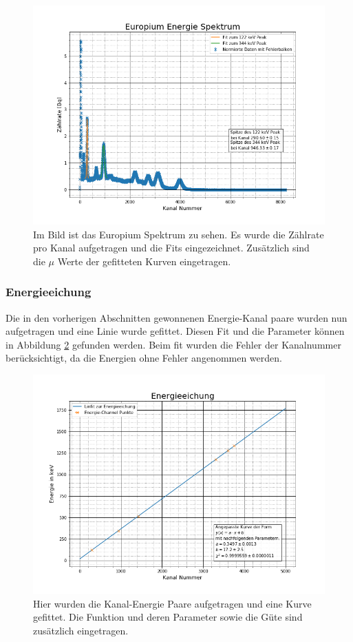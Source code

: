 \begin{figure}[h]
	\centering
	\includegraphics[scale=0.5]{Bilder/Europium}
	\caption[Europium Spektrum mit Peaks]{\small Im Bild ist das Europium Spektrum zu sehen. Es wurde die Zählrate pro Kanal aufgetragen und die Fits eingezeichnet. Zusätzlich sind die $\mu$ Werte der gefitteten Kurven eingetragen.}
	\label{europium}
\end{figure}
\subsubsection{Energieeichung}
Die in den vorherigen Abschnitten gewonnenen Energie-Kanal paare wurden nun aufgetragen und eine Linie wurde gefittet. Diesen Fit und die Parameter können in Abbildung \ref{energiekali} gefunden werden. Beim fit wurden die Fehler der Kanalnummer berücksichtigt, da die Energien ohne Fehler angenommen werden.

\begin{figure}[h]
	\centering
	\includegraphics[scale=0.5]{Bilder/Energieeichung}
	\caption[Energieeichung]{\small Hier wurden die Kanal-Energie Paare aufgetragen und eine Kurve gefittet. Die Funktion und deren Parameter sowie die Güte sind zusätzlich eingetragen. }
	\label{energiekali}
\end{figure}

